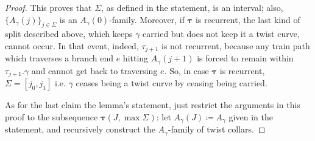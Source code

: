 \begin{proof}
This proves that $\Sigma$, as defined in the statement, is an interval; also, $\{A_\gamma(j)\}_{j\in\Sigma}$ is an $A_\gamma(0)$-family. Moreover, if $\bm\tau$ is recurrent, the last kind of split described above, which keeps $\gamma$ carried but does not keep it a twist curve, cannot occur. In that event, indeed, $\tau_{j+1}$ is not recurrent, because any train path which traverses a branch end $e$ hitting $A_\gamma(j+1)$ is forced to remain within $\tau_{j+1}.\gamma$ and cannot get back to traversing $e$. So, in case $\bm\tau$ is recurrent, $\Sigma=[j_0,j_1]$ i.e. $\gamma$ ceases being a twist curve by ceasing being carried.

As for the last claim the lemma's statement, just restrict the arguments in this proof to the subsequence $\bm\tau(J,\max \Sigma)$: let $A_\gamma(J)\coloneqq A_\gamma$ given in the statement, and recursively construct the $A_\gamma$-family of twist collars.
\end{proof}

